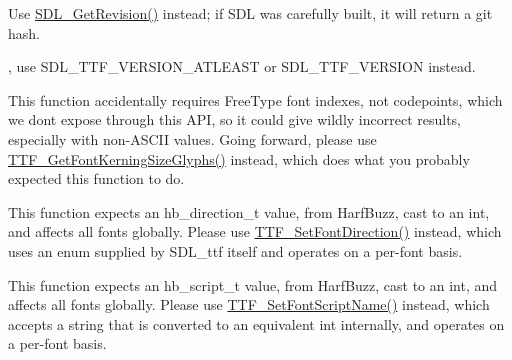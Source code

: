 
\begin{DoxyRefList}
\item[Global(e) \mbox{\hyperlink{_s_d_l__version_8h_a3aaf4a973a60915fd9a30de51b17c3e4}{SDL\+\_\+\+Get\+Revision\+Number}} (void)]\label{deprecated__deprecated000006}%
%
Use \mbox{\hyperlink{_s_d_l__version_8h_a2bfe0579c07429a1090fdcc42a49460d}{SDL\+\_\+\+Get\+Revision()}} instead; if SDL was carefully built, it will return a git hash. 
\item[Global(e) \mbox{\hyperlink{_s_d_l__ttf_8h_a2ba3940255fc228728d9eb0c5a815aad}{SDL\+\_\+\+TTF\+\_\+\+COMPILEDVERSION}} ]\label{deprecated__deprecated000001}%
%
, use SDL\+\_\+\+TTF\+\_\+\+VERSION\+\_\+\+ATLEAST or SDL\+\_\+\+TTF\+\_\+\+VERSION instead.  
\item[Fichier \mbox{\hyperlink{_s_d_l__types_8h}{SDL\+\_\+types.h}} ]\label{deprecated__deprecated000005}%
%
  
\item[Global(e) \mbox{\hyperlink{_s_d_l__ttf_8h_afa971c6ffc92e8d5e2a08cc396549756}{TTF\+\_\+\+Get\+Font\+Kerning\+Size}} (TTF\+\_\+\+Font $\ast$font, int prev\+\_\+index, int index)]\label{deprecated__deprecated000002}%
%
This function accidentally requires Free\+Type font indexes, not codepoints, which we don\textquotesingle{}t expose through this API, so it could give wildly incorrect results, especially with non-\/\+ASCII values. Going forward, please use \mbox{\hyperlink{_s_d_l__ttf_8h_a0e86fd47f470d6f21c47622035da50bd}{TTF\+\_\+\+Get\+Font\+Kerning\+Size\+Glyphs()}} instead, which does what you probably expected this function to do. 
\item[Global(e) \mbox{\hyperlink{_s_d_l__ttf_8h_a56c4ce011601169540e6771a037f126a}{TTF\+\_\+\+Set\+Direction}} (int direction)]\label{deprecated__deprecated000003}%
%
This function expects an hb\+\_\+direction\+\_\+t value, from Harf\+Buzz, cast to an int, and affects all fonts globally. Please use \mbox{\hyperlink{_s_d_l__ttf_8h_a4986991c40e1353397099d2134928010}{TTF\+\_\+\+Set\+Font\+Direction()}} instead, which uses an enum supplied by SDL\+\_\+ttf itself and operates on a per-\/font basis. 
\item[Global(e) \mbox{\hyperlink{_s_d_l__ttf_8h_a6ed08cb4253538af931e5e97505a856d}{TTF\+\_\+\+Set\+Script}} (int script)]\label{deprecated__deprecated000004}%
%
This function expects an hb\+\_\+script\+\_\+t value, from Harf\+Buzz, cast to an int, and affects all fonts globally. Please use \mbox{\hyperlink{_s_d_l__ttf_8h_ac893167cd8ad82c0342157c15d99dff2}{TTF\+\_\+\+Set\+Font\+Script\+Name()}} instead, which accepts a string that is converted to an equivalent int internally, and operates on a per-\/font basis.
\end{DoxyRefList}